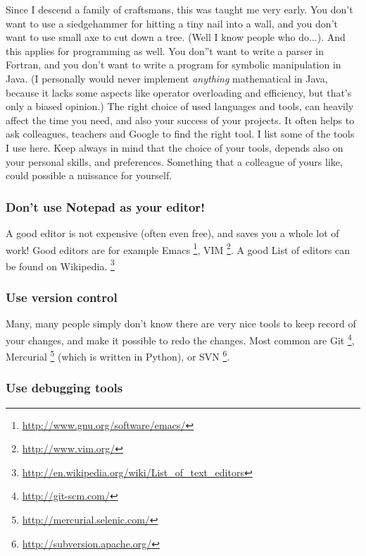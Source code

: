 \documentclass[letterpaper,10pt,english]{manual}
\begin{document}
Since I descend a family of craftsmans, this was taught me very early. You don't want to use
a siedgehammer for hitting a tiny nail into a wall, and you don't want to use small axe to cut down a tree.
(Well I know people who do...). And this applies for programming as well. You don''t want to write a parser in Fortran,
and you don't want to write a program for symbolic manipulation in Java. (I personally would never implement \emph{anything}
mathematical in Java, because it lacks some aspects like operator overloading and efficiency, but that's only a biased opinion.)
The right choice of used languages
and tools, can heavily affect the time you need, and also your success of your projects. It often helps to
ask colleagues, teachers and Google to find the right tool. I list
some of the tools I use here. Keep always in mind that the choice of
your tools, depends also on your personal skills, and
preferences. Something that a colleague of yours like, could possible
a nuissance for yourself.


\subsubsection{Don't use Notepad as your editor!}

A good editor is not expensive (often even free), and saves you a
whole lot of work! Good editors are for example Emacs \footnote{
\href{http://www.gnu.org/software/emacs/}{http://www.gnu.org/software/emacs/}
}, VIM \footnote{
\href{http://www.vim.org/}{http://www.vim.org/}
}.
A good List of editors can be found on Wikipedia. \footnote{
\href{http://en.wikipedia.org/wiki/List\_of\_text\_editors}{http://en.wikipedia.org/wiki/List\_of\_text\_editors}
}


\subsubsection{Use version control}

Many, many people simply don't know there are very nice
tools to keep record of your changes, and make it possible
to redo the changes. Most common are Git \footnote{
\href{http://git-scm.com/}{http://git-scm.com/}
}, Mercurial \footnote{
\href{http://mercurial.selenic.com/}{http://mercurial.selenic.com/}
} (which is written in Python),
or SVN \footnote{
\href{http://subversion.apache.org/}{http://subversion.apache.org/}
}.


\subsubsection{Use debugging tools}
\end{document}
